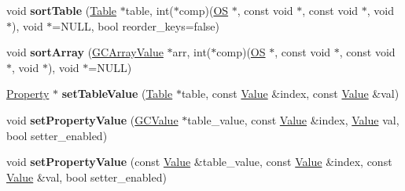 \begin{DoxyCompactItemize}
\item 
void {\bfseries sort\+Table} (\hyperlink{struct_object_script_1_1_o_s_1_1_core_1_1_table}{Table} $\ast$table, int($\ast$comp)(\hyperlink{class_object_script_1_1_o_s}{OS} $\ast$, const void $\ast$, const void $\ast$, void $\ast$), void $\ast$=N\+U\+LL, bool reorder\+\_\+keys=false)\hypertarget{class_object_script_1_1_o_s_1_1_core_ac4bc81d773721728b5a0aad7e23c4fef}{}\label{class_object_script_1_1_o_s_1_1_core_ac4bc81d773721728b5a0aad7e23c4fef}

\item 
void {\bfseries sort\+Array} (\hyperlink{struct_object_script_1_1_o_s_1_1_core_1_1_g_c_array_value}{G\+C\+Array\+Value} $\ast$arr, int($\ast$comp)(\hyperlink{class_object_script_1_1_o_s}{OS} $\ast$, const void $\ast$, const void $\ast$, void $\ast$), void $\ast$=N\+U\+LL)\hypertarget{class_object_script_1_1_o_s_1_1_core_a9f9b081e028baccbc53ff78cae26420b}{}\label{class_object_script_1_1_o_s_1_1_core_a9f9b081e028baccbc53ff78cae26420b}

\item 
\hyperlink{struct_object_script_1_1_o_s_1_1_core_1_1_property}{Property} $\ast$ {\bfseries set\+Table\+Value} (\hyperlink{struct_object_script_1_1_o_s_1_1_core_1_1_table}{Table} $\ast$table, const \hyperlink{struct_object_script_1_1_o_s_1_1_core_1_1_value}{Value} \&index, const \hyperlink{struct_object_script_1_1_o_s_1_1_core_1_1_value}{Value} \&val)\hypertarget{class_object_script_1_1_o_s_1_1_core_a980ed5f71f817c9ea9364b61c9861495}{}\label{class_object_script_1_1_o_s_1_1_core_a980ed5f71f817c9ea9364b61c9861495}

\item 
void {\bfseries set\+Property\+Value} (\hyperlink{struct_object_script_1_1_o_s_1_1_core_1_1_g_c_value}{G\+C\+Value} $\ast$table\+\_\+value, const \hyperlink{struct_object_script_1_1_o_s_1_1_core_1_1_value}{Value} \&index, \hyperlink{struct_object_script_1_1_o_s_1_1_core_1_1_value}{Value} val, bool setter\+\_\+enabled)\hypertarget{class_object_script_1_1_o_s_1_1_core_aaf2ea2b33faed8fa1e5d8b92c64d66f0}{}\label{class_object_script_1_1_o_s_1_1_core_aaf2ea2b33faed8fa1e5d8b92c64d66f0}

\item 
void {\bfseries set\+Property\+Value} (const \hyperlink{struct_object_script_1_1_o_s_1_1_core_1_1_value}{Value} \&table\+\_\+value, const \hyperlink{struct_object_script_1_1_o_s_1_1_core_1_1_value}{Value} \&index, const \hyperlink{struct_object_script_1_1_o_s_1_1_core_1_1_value}{Value} \&val, bool setter\+\_\+enabled)\hypertarget{class_object_script_1_1_o_s_1_1_core_abbe01cf268fdb6a6f1bfa33f1a8cedde}{}\label{class_object_script_1_1_o_s_1_1_core_abbe01cf268fdb6a6f1bfa33f1a8cedde}


\end{DoxyCompactItemize}
